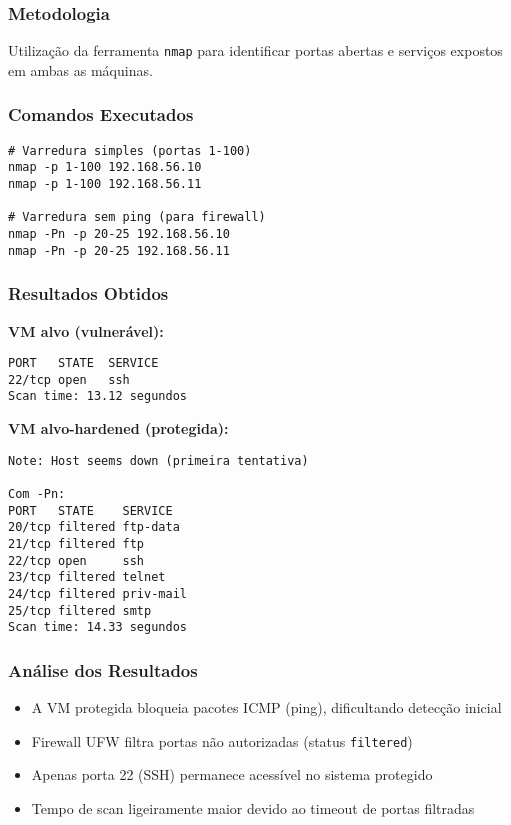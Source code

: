 \documentclass[12pt]{article}
\begin{document}
\subsubsection{Metodologia}
Utilização da ferramenta \texttt{nmap} para identificar portas abertas e serviços expostos em ambas as máquinas.

\subsubsection{Comandos Executados}
\begin{verbatim}
# Varredura simples (portas 1-100)
nmap -p 1-100 192.168.56.10
nmap -p 1-100 192.168.56.11

# Varredura sem ping (para firewall)
nmap -Pn -p 20-25 192.168.56.10
nmap -Pn -p 20-25 192.168.56.11
\end{verbatim}

\subsubsection{Resultados Obtidos}

\textbf{VM alvo (vulnerável):}
\begin{verbatim}
PORT   STATE  SERVICE
22/tcp open   ssh
Scan time: 13.12 segundos
\end{verbatim}

\textbf{VM alvo-hardened (protegida):}
\begin{verbatim}
Note: Host seems down (primeira tentativa)

Com -Pn:
PORT   STATE    SERVICE
20/tcp filtered ftp-data
21/tcp filtered ftp
22/tcp open     ssh
23/tcp filtered telnet
24/tcp filtered priv-mail
25/tcp filtered smtp
Scan time: 14.33 segundos
\end{verbatim}

\subsubsection{Análise dos Resultados}
\begin{itemize}
    \item A VM protegida bloqueia pacotes ICMP (ping), dificultando detecção inicial
    \item Firewall UFW filtra portas não autorizadas (status \texttt{filtered})
    \item Apenas porta 22 (SSH) permanece acessível no sistema protegido
    \item Tempo de scan ligeiramente maior devido ao timeout de portas filtradas
\end{itemize}
\end{document}
